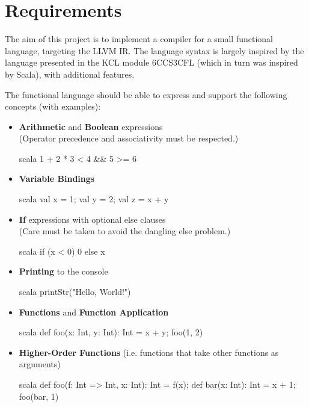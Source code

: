 \chapter{Requirements}
\label{sec:requirements}

The aim of this project is to implement a compiler for a small functional language, targeting the
LLVM IR. The language syntax is largely inspired by the language presented in the KCL module
6CCS3CFL (which in turn was inspired by Scala), with additional features.

The functional language should be able to express and support the following concepts (with
examples):

\begin{itemize}
      \item \textbf{Arithmetic} and \textbf{Boolean} expressions \\
            (Operator precedence and associativity must be respected.)
            \begin{code}{scala}
                  1 + 2 * 3 < 4 && 5 >= 6
            \end{code}

      \item \textbf{Variable Bindings}
            \begin{code}{scala}
                  val x = 1; val y = 2; val z = x + y
            \end{code}

      \item \textbf{If} expressions with optional else clauses \\
            (Care must be taken to avoid the dangling else problem.)
            \begin{code}{scala}
                  if (x < 0) 0 else x
            \end{code}

      \item \textbf{Printing} to the console
            \begin{code}{scala}
                  printStr("Hello, World!")
            \end{code}

      \item \textbf{Functions} and \textbf{Function Application}
            \begin{code}{scala}
                  def foo(x: Int, y: Int): Int = x + y;
                  foo(1, 2)
            \end{code}

      \item \textbf{Higher-Order Functions} (i.e. functions that take other functions as arguments)
            \begin{code}{scala}
                  def foo(f: Int => Int, x: Int): Int = f(x);
                  def bar(x: Int): Int = x + 1;
                  foo(bar, 1)
            \end{code}


\end{itemize}
